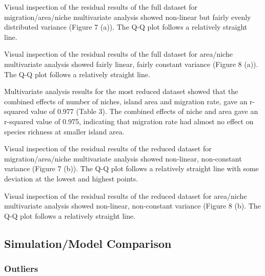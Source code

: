 \documentclass{article}
\begin{document}
\noindent Visual inspection of the residual results of the full dataset for migration/area/niche multivariate analysis showed non-linear but fairly evenly distributed variance (Figure 7 (a)). The Q-Q plot follows a relatively straight line. \bigskip

\noindent Visual inspection of the residual results of the full dataset for area/niche multivariate analysis showed fairly linear, fairly constant variance (Figure 8 (a)). The Q-Q plot follows a relatively straight line. \bigskip

\noindent Multivariate analysis results for the most reduced dataset showed that the combined effects of number of niches, island area and migration rate, gave an r-squared value of 0.977 (Table 3). The combined effects of niche and area gave an r-squared value of 0.975, indicating that migration rate had almost no effect on species richness at smaller island area. \bigskip

\noindent Visual inspection of the residual results of the reduced dataset for migration/area/niche multivariate analysis showed non-linear, non-constant variance (Figure 7 (b)). The Q-Q plot follows a relatively straight line with some deviation at the lowest and highest points. 

\noindent Visual inspection of the residual results of the reduced dataset for area/niche multivariate analysis showed non-linear, non-constant variance (Figure 8 (b). The Q-Q plot follows a relatively straight line. 

\subsection{Simulation/Model Comparison}

\subsubsection{Outliers}
\end{document}
